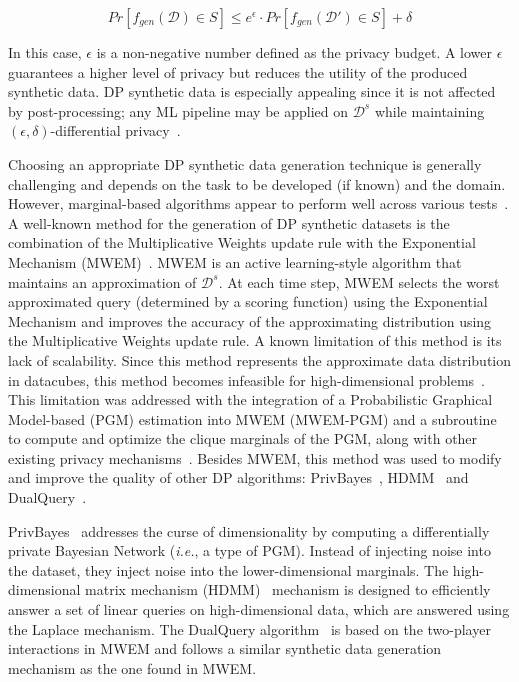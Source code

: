 \begin{equation}
    Pr[f_{gen}(\mathcal{D}) \in S] \le e^{\epsilon} \cdot
    Pr[f_{gen}(\mathcal{D}') \in S] + \delta
\end{equation}
 
In this case, $\epsilon$ is a non-negative number defined as the privacy
budget. A lower $\epsilon$ guarantees a higher level of privacy but reduces
the utility of the produced synthetic data. DP synthetic data is especially
appealing since it is not affected by post-processing; any ML pipeline may be
applied on $\mathcal{D}^s$ while maintaining $(\epsilon, \delta)$-differential
privacy~\cite{dwork2014algorithmic}.

Choosing an appropriate DP synthetic data generation technique
is generally challenging and depends on the task to be developed (if known) and the domain. However,
marginal-based algorithms appear to perform well across various
tests~\cite{tao2021benchmarking}. A well-known method for the generation of DP
synthetic datasets is the combination of the Multiplicative Weights update
rule with the Exponential Mechanism (MWEM)~\cite{hardt2012simple}. MWEM is an
active learning-style algorithm that maintains an approximation of
$\mathcal{D}^s$. At each time step, MWEM selects the worst approximated query
(determined by a scoring function) using the Exponential Mechanism and
improves the accuracy of the approximating distribution using the
Multiplicative Weights update rule. A known limitation of this method is its
lack of scalability. Since this method represents the approximate data
distribution in datacubes, this method becomes infeasible for high-dimensional
problems~\cite{mckenna2019graphical}. This limitation was addressed with the
integration of a Probabilistic Graphical Model-based (PGM) estimation into
MWEM (MWEM-PGM) and a subroutine to compute and optimize the clique marginals
of the PGM, along with other existing privacy
mechanisms~\cite{mckenna2019graphical}. Besides MWEM, this method was used to
modify and improve the quality of other DP algorithms:
PrivBayes~\cite{zhang2017privbayes}, HDMM~\cite{mckenna2018optimizing} and
DualQuery~\cite{gaboardi2014dual}.

PrivBayes~\cite{zhang2017privbayes} addresses the curse of dimensionality by
computing a differentially private Bayesian Network (\textit{i.e.}, a type of
PGM). Instead of injecting noise into the dataset, they inject noise into the
lower-dimensional marginals. The high-dimensional matrix mechanism
(HDMM)~\cite{mckenna2018optimizing} mechanism is designed to efficiently
answer a set of linear queries on high-dimensional data, which are answered
using the Laplace mechanism. The DualQuery algorithm~\cite{gaboardi2014dual}
is based on the two-player interactions in MWEM and follows a similar
synthetic data generation mechanism as the one found in MWEM\@.

